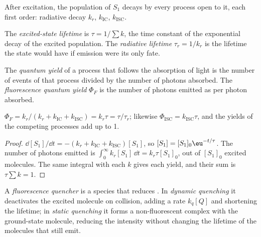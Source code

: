 After excitation, the population of $S_1$ decays by every process open to it,
each first order: radiative decay $k_r$,  $k_{\mathrm{IC}}$,
 $k_{\mathrm{ISC}}$.

\begin{definition}\label{def:b3:electronic-spectroscopy:lifetime}
The \emph{excited-state lifetime} is $\tau =
1/\sum k$, the time constant of the exponential decay of the excited
population. The \emph{radiative lifetime} $\tau_r =
1/k_r$ is the lifetime the state would have if emission were its only
fate.
\end{definition}

\begin{definition}\label{def:b3:electronic-spectroscopy:quantum-yield}
The \emph{quantum yield} of a process that follows the
absorption of light is the number of events of that process divided by the
number of photons absorbed. The \emph{fluorescence quantum
yield} $\Phi_F$ is the number of photons
emitted as  per photon absorbed.
\end{definition}

\begin{proposition}\label{prop:b3:electronic-spectroscopy:quantum-yield}
$\Phi_F = k_r/(k_r + k_{\mathrm{IC}} + k_{\mathrm{ISC}}) = k_r\tau = \tau/\tau_r$; likewise
$\Phi_{\mathrm{ISC}} = k_{\mathrm{ISC}}\tau$, and the yields of the competing processes add
up to 1.
\end{proposition}

\begin{proof}
$\dd[S_1]/\dd t = -(k_r + k_{\mathrm{IC}} + k_{\mathrm{ISC}})[S_1]$, so $[S_1] = [S_1]_0\eu^{-t/\tau}$.
The number of photons emitted is $\int_0^\infty k_r[S_1]\,\dd t = k_r\tau[S_1]_0$, out of
$[S_1]_0$ excited molecules. The same integral with each $k$ gives each yield,
and their sum is $\tau\sum k = 1$.
\end{proof}

\begin{definition}\label{def:b3:electronic-spectroscopy:quencher}
A \emph{fluorescence quencher} is a species that
reduces . In \emph{dynamic quenching} it
deactivates the excited molecule on collision, adding a rate $k_q[Q]$ and
shortening the lifetime; in \emph{static quenching} it
forms a non-fluorescent complex with the ground-state molecule, reducing the
intensity without changing the lifetime of the molecules that still emit.
\end{definition}


